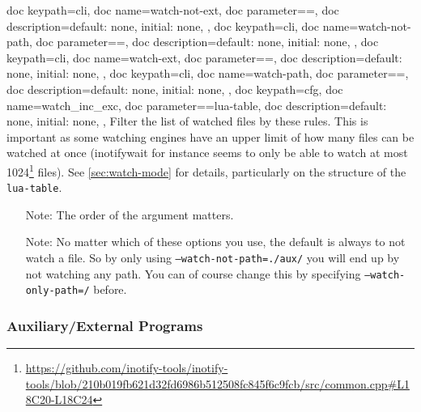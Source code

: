 \documentclass[a4paper, 11pt]{scrartcl}
\begin{document}
\begin{docKeys}[
	]{
		{
			doc keypath=cli,
			doc name=watch-not-ext,
			doc parameter={=},
			doc description={default: none, initial: none},
		},
		{
			doc keypath=cli,
			doc name=watch-not-path,
			doc parameter={=},
			doc description={default: none, initial: none},
		},
		{
			doc keypath=cli,
			doc name=watch-ext,
			doc parameter={=},
			doc description={default: none, initial: none},
		},
		{
			doc keypath=cli,
			doc name=watch-path,
			doc parameter={=},
			doc description={default: none, initial: none},
		},
		{
			doc keypath=cfg,
			doc name=watch_inc_exc,
			doc parameter={=lua-table},
			doc description={default: none, initial: none},
		},
	}
	Filter the list of watched files by these rules.
	This is important as some watching engines have an upper limit of how many files can be watched at once (inotifywait for instance seems to only be able to watch at most 1024\footnote{\url{https://github.com/inotify-tools/inotify-tools/blob/210b019fb621d32fd6986b512508fc845f6c9fcb/src/common.cpp\#L18C20-L18C24}} files).
	See \cref{sec:watch-mode} for details, particularly on the structure of the \texttt{lua-table}.

	\begin{itemize}
		\item[Note:] The order of the argument matters.
		\item[Note:] No matter which of these options you use, the default is always to not watch a file.
			So by only using \texttt{--watch-not-path=./aux/} you will end up by not watching any path.
			You can of course change this by specifying \texttt{--watch-only-path=/} before.
	\end{itemize}
\end{docKeys}

\subsubsection{Auxiliary/External Programs}
\end{document}
